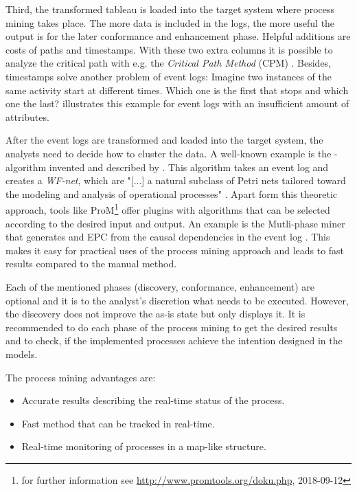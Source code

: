 Third, the transformed tableau is loaded into the target system where process mining takes place. The more data is included in the logs, the more useful the output is for the later conformance and enhancement phase. Helpful additions are costs of paths and timestamps. With these two extra columns it is possible to analyze the critical path with e.g. the \textit{Critical Path Method} (CPM) \cite{Domschke2015}. Besides, timestamps solve another problem of event logs: Imagine two instances of the same activity start at different times. Which one is the first that stops and which one the last? \cite{Aalst2011} illustrates this example for event logs with an insufficient amount of attributes. 

After the event logs are transformed and loaded into the target system, the analysts need to decide how to cluster the data. A well-known example is the \textalpha -algorithm invented and described by \cite{Aalst2011}. This algorithm takes an event log and creates a \textit{WF-net}, which are "[...] a natural subclass of Petri nets tailored toward the modeling and analysis of operational processes" \cite{Aalst2011}. Apart form this theoretic approach, tools like ProM\footnote{for further information see \url{http://www.promtools.org/doku.php}, 2018-09-12} offer plugins with algorithms that can be selected according to the desired input and output. An example is the Mutli-phase miner that generates and EPC from the causal dependencies in the event log \cite{Weimer2006}. This makes it easy for practical uses of the process mining approach and leads to fast results compared to the manual method. 

Each of the mentioned phases (discovery, conformance, enhancement) are optional and it is to the analyst's discretion what needs to be executed. However, the discovery does not improve the as-is state but only displays it. It is recommended to do each phase of the process mining to get the desired results and to check, if the implemented processes achieve the intention designed in the models. 

The process mining advantages are: 
\begin{itemize}
\item Accurate results describing the real-time status of the process. 
\item Fast method that can be tracked in real-time. 
\item Real-time monitoring of processes in a map-like structure. 
\end{itemize} 
 
